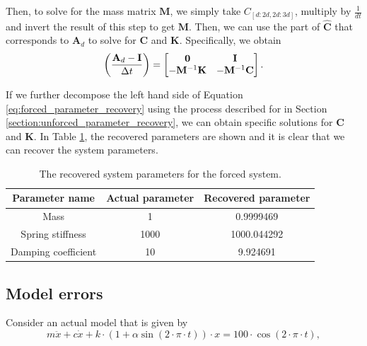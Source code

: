 \documentclass{article}
\begin{document}
Then, to solve for the mass matrix $\mathbf{M}$, we simply take $C_{[d:2d, 2d:3d]}$, multiply by $\frac{1}{dt}$ and invert the result of this step to get $\mathbf{M}$. Then, we can use the part of $\hat{\mathbf{C}}$ that corresponds to $\mathbf{A}_d$ to solve for $\mathbf{C}$ and $\mathbf{K}$. Specifically, we obtain
\begin{equation} \label{eq:forced_parameter_recovery}
\left( \frac{\mathbf{A}_d - \mathbf{I}}{\Delta t} \right) = 
\begin{bmatrix}
\mathbf{0} & \mathbf{I} \\
-\mathbf{M}^{-1}\mathbf{K} & -\mathbf{M}^{-1}\mathbf{C} \\
\end{bmatrix}. \\
\end{equation}

If we further decompose the left hand side of Equation \eqref{eq:forced_parameter_recovery} using the process described for in Section \ref{section:unforced_parameter_recovery}, we can obtain specific solutions for $\mathbf{C}$ and $\mathbf{K}$. In Table \ref{tab:Q4b_table1}, the recovered parameters are shown and it is clear that we can recover the system parameters.
\begin{table}[!htb]
\centering
\caption{The recovered system parameters for the forced system.}
\label{tab:Q4b_table1}
\begin{tabular}{@{}ccc@{}}
\toprule
Parameter name & Actual parameter & Recovered parameter \\ \midrule
Mass & 1 & 0.9999469 \\
Spring stiffness & 1000 & 1000.044292 \\
Damping coefficient & 10 & 9.924691 \\ \bottomrule
\end{tabular}
\end{table}

\subsection{Model errors}
Consider an actual model that is given by
\begin{equation}\label{eq:time_varying_model}
m \ddot{x} + c \dot{x} + k \cdot \left( 1 + \alpha \sin\left(2 \cdot \pi \cdot t \right) \right) \cdot x = 100 \cdot \cos \left( 2 \cdot \pi \cdot t \right),
\end{equation}
\end{document}
